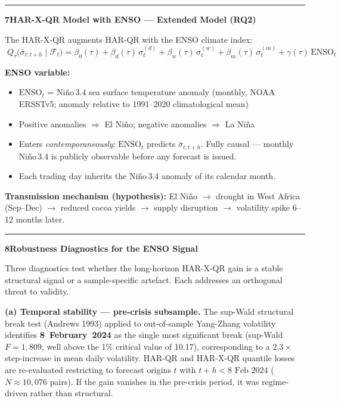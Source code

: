 \documentclass[10pt,a4paper]{article}
\newcommand{\sectionrule}{\vspace{0.3em}\hrule\vspace{0.5em}}
\begin{document}
\sectionrule

\textbf{7\quad HAR-X-QR Model with ENSO --- Extended Model (RQ2)}

The HAR-X-QR augments HAR-QR with the ENSO climate index:
\begin{equation*}
\boxed{\;
Q_{\tau}\!\bigl(\bar{\sigma}_{t:t+h}\mid\mathcal{F}_t\bigr)
= \beta_0(\tau) + \beta_d(\tau)\,\sigma_t^{(d)} + \beta_w(\tau)\,\sigma_t^{(w)} + \beta_m(\tau)\,\sigma_t^{(m)} + \gamma(\tau)\,\text{ENSO}_t
\;}
\end{equation*}

\textbf{ENSO variable:}
\begin{itemize}
\item $\text{ENSO}_t$ = Ni\~no\,3.4 sea surface temperature anomaly
  (monthly, NOAA ERSSTv5; anomaly relative to 1991--2020 climatological mean)
\item Positive anomalies $\Rightarrow$ El Ni\~no;
  negative anomalies $\Rightarrow$ La Ni\~na
\item Enters \emph{contemporaneously}: $\text{ENSO}_t$ predicts
  $\bar{\sigma}_{t:t+h}$. Fully causal --- monthly Ni\~no\,3.4 is publicly
  observable before any forecast is issued.
\item Each trading day inherits the Ni\~no\,3.4 anomaly of its calendar month.
\end{itemize}

\textbf{Transmission mechanism (hypothesis):}
El Ni\~no $\to$ drought in West Africa (Sep--Dec) $\to$ reduced cocoa yields
$\to$ supply disruption $\to$ volatility spike 6--12 months later.

\sectionrule

\textbf{8\quad Robustness Diagnostics for the ENSO Signal}

Three diagnostics test whether the long-horizon HAR-X-QR gain is a stable
structural signal or a sample-specific artefact. Each addresses an orthogonal
threat to validity.

\medskip
\textbf{(a) Temporal stability --- pre-crisis subsample.}
The sup-Wald structural break test (Andrews 1993) applied to
out-of-sample Yang-Zhang volatility identifies \textbf{8~February~2024} as
the single most significant break (sup-Wald $F = 1{,}809$, well above the
1\% critical value of 10.17), corresponding to a $2.3\times$ step-increase
in mean daily volatility. HAR-QR and HAR-X-QR quantile losses are re-evaluated
restricting to forecast origins $t$ with $t + h < \text{8 Feb 2024}$
($N \approx 10{,}076$ pairs). If the gain vanishes in the pre-crisis period,
it was regime-driven rather than structural.
\end{document}
